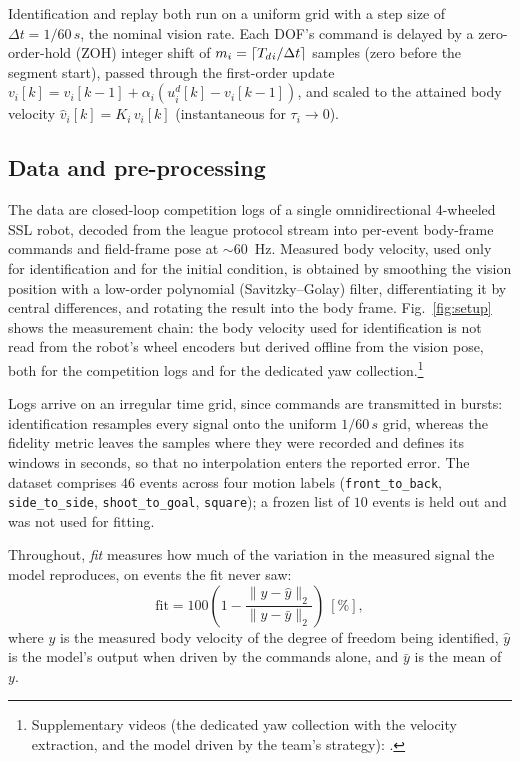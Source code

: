 Identification and replay both run on a uniform grid with a step size of $\Delta t = 1/60\,\si{s}$, the nominal vision rate. Each DOF's command is delayed by a zero-order-hold (ZOH) integer shift of $m_i = \lceil T_{d}{}_i/\Delta t\rceil$ samples (zero before the segment start), passed through the first-order update $v_i[k] = v_i[k-1] + \alpha_i(u^{d}_i[k] - v_i[k-1])$, and scaled to the attained body velocity $\hat v_i[k] = K_i\, v_i[k]$ (instantaneous for $\tau_i \to 0$). 

\subsection{Data and pre-processing}
\label{sec:method:data}
The data are closed-loop competition logs of a single omnidirectional 4-wheeled SSL robot, decoded from the league protocol stream into per-event body-frame commands and field-frame pose at $\sim$\SI{60}{Hz}. Measured body velocity, used only for identification and for the initial condition, is obtained by smoothing the vision position with a low-order polynomial (Savitzky--Golay) filter, differentiating it by central differences, and rotating the result into the body frame. Fig.~\ref{fig:setup} shows the measurement chain: the body velocity used for identification is not read from the robot's wheel encoders but derived offline from the vision pose, both for the competition logs and for the dedicated yaw collection.\footnote{Supplementary videos (the dedicated yaw collection with the velocity extraction, and the model driven by the team's strategy): \videolink.}



Logs arrive on an irregular time grid, since commands are transmitted in bursts: identification resamples every signal onto the uniform $1/60\,\si{s}$ grid, whereas the fidelity metric leaves the samples where they were recorded and defines its windows in seconds, so that no interpolation enters the reported error.
The dataset comprises $46$ events across four motion labels (\texttt{front\_to\_back}, \texttt{side\_to\_side}, \texttt{shoot\_to\_goal}, \texttt{square}); a frozen list of $10$ events is held out and was not used for fitting.

Throughout, \emph{fit} measures how much of the variation in the measured signal the model reproduces, on events the fit never saw:
\begin{equation}
  \mathrm{fit} = 100\left(1 -
  \frac{\lVert y - \hat{y}\rVert_2}{\lVert y - \bar{y}\rVert_2}\right)\ [\%],
  \label{eq:fit}
\end{equation}
where $y$ is the measured body velocity of the degree of freedom being identified, $\hat{y}$ is the model's output when driven by the commands alone, and $\bar{y}$ is the mean of $y$.

